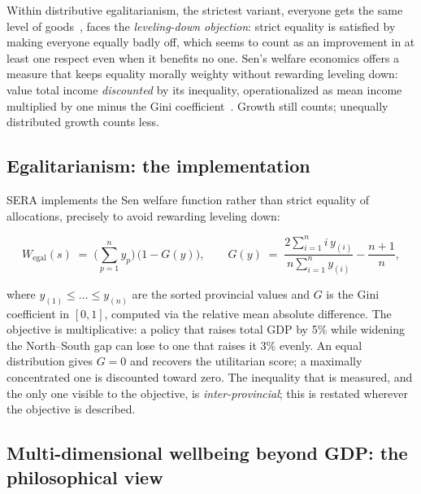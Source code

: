 \documentclass[11pt,a4paper]{article}
\begin{document}
Within distributive egalitarianism, the strictest variant, everyone gets
the same level of goods~\cite{lamont2017}, faces the \emph{leveling-down
objection}: strict equality is satisfied by making everyone equally badly off,
which seems to count as an improvement in at least one respect even when it
benefits no one. Sen's welfare economics offers a measure that keeps equality
morally weighty without rewarding leveling down: value total income
\emph{discounted} by its inequality, operationalized as mean income multiplied
by one minus the Gini coefficient~\cite{sen1976}. Growth still counts;
unequally distributed growth counts less.

\subsection{Egalitarianism: the implementation}

SERA implements the Sen welfare function rather than strict equality of
allocations, precisely to avoid rewarding leveling down:

\begin{equation}
    W_{\text{egal}}(s) \;=\; \Big(\sum_{p=1}^{n} y_p\Big)\,\big(1 - G(y)\big),
    \qquad
    G(y) \;=\; \frac{2\sum_{i=1}^{n} i\, y_{(i)}}{n \sum_{i=1}^{n} y_{(i)}}
    - \frac{n+1}{n},
\end{equation}

where $y_{(1)} \le \dots \le y_{(n)}$ are the sorted provincial values and $G$
is the Gini coefficient in $[0,1]$, computed via the relative mean absolute
difference. The objective is multiplicative: a policy that raises total GDP by
5\% while widening the North--South gap can lose to one that raises it 3\%
evenly. An equal distribution gives $G=0$ and recovers the utilitarian score; a
maximally concentrated one is discounted toward zero. The inequality that is
measured, and the only one visible to the objective, is
\emph{inter-provincial}; this is restated wherever the objective is described.

\subsection{Multi-dimensional wellbeing beyond GDP: the philosophical view}
\label{sec:wellbeing-philo}
\end{document}
